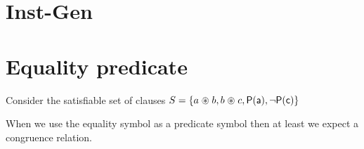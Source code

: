 	



\section{Inst-Gen}

\section{Equality predicate}

Consider the satisfiable set of clauses $S = \{a \mathrel{\circledast} b, b \mathrel{\circledast} c, {\mathsf P}({\mathsf a}), \lnot {\mathsf P}({\mathsf c}) \}$

When we use the equality symbol as a predicate symbol 
then at least we expect a congruence relation.



